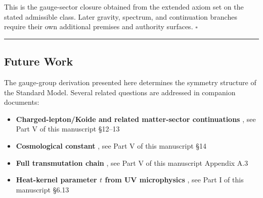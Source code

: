 This is the gauge-sector closure obtained from the extended axiom set on the stated admissible class. Later gravity, spectrum, and continuation branches require their own additional premises and authority surfaces. \(\square\)

\begin{center}\rule{0.5\linewidth}{0.5pt}\end{center}

\subsection{Future Work}\label{10-future-work}

The gauge-group derivation presented here determines the symmetry structure of the Standard Model. Several related questions are addressed in companion documents:

\begin{itemize}
\tightlist
\item
  \textbf{Charged-lepton/Koide and related matter-sector continuations} , see Part V of this manuscript \S{}12--13
\item
  \textbf{Cosmological constant} , see Part V of this manuscript \S{}14
\item
  \textbf{Full transmutation chain} , see Part V of this manuscript Appendix A.3
\item
  \textbf{Heat-kernel parameter \(t\) from UV microphysics} , see Part I of this manuscript \S{}6.13
\end{itemize}
